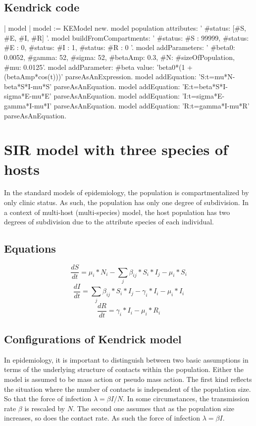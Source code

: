 \documentclass[a4paper,10pt,twoside]{book}
\begin{document}
\subsection{ Kendrick code}

\begin{code}{}
	| model |
	model := KEModel new.
	model population attributes: '{ #status: [#S, #E, #I, #R] }'.
	model
		buildFromCompartments:
			'{
		{ #status: #S }: 99999,
		{ #status: #E }: 0,
		{ #status: #I }: 1,
		{ #status: #R }: 0
	}'.
	model addParameters: '{
		#beta0: 0.0052,
		#gamma: 52,
		#sigma: 52,
		#betaAmp: 0.3,
		#N: #sizeOfPopulation,
		#mu: 0.0125}'.
	model
		addParameter: #beta
		value: 'beta0*(1 + (betaAmp*cos(t)))' parseAsAnExpression.
	model
		addEquation: 'S:t=mu*N-beta*S*I-mu*S' parseAsAnEquation.
	model
		addEquation: 'E:t=beta*S*I-sigma*E-mu*E' parseAsAnEquation.
	model
		addEquation: 'I:t=sigma*E-gamma*I-mu*I' parseAsAnEquation.
	model
		addEquation: 'R:t=gamma*I-mu*R' parseAsAnEquation.
\end{code}

\section{ SIR model with three species of hosts}
In the standard models of epidemiology, the population is compartmentalized by only clinic status.
As such, the population has only one degree of subdivision.
In a context of multi-host (multi-species) model, the host population has two degrees of subdivision due to the attribute species of each individual.
\subsection{ Equations}

  \begin{equation}
    \frac{dS}{dt} = \mu_i*N_i - \sum_j \beta_{ij}*S_i*I_j - \mu_i*S_i
  \end{equation}
  \begin{equation}
    \frac{dI}{dt} = \sum_j \beta_{ij}*S_i*I_j - \gamma_i*I_i - \mu_i*I_i
  \end{equation}
  \begin{equation}
    \frac{dR}{dt} = \gamma_i*I_i - \mu_i*R_i
  \end{equation}
  
\subsection{ Configurations of Kendrick model}
In epidemiology, it is important to distinguish between two basic assumptions in terms of the underlying structure of contacts within the population.
Either the model is assumed to be mass action or pseudo mass action.
The first kind reflects the situation where the number of contacts is independent of the population size.
So that the force of infection  $\lambda = \beta I / N$.
In some circumstances, the transmission rate  $\beta$ is rescaled by  $N$.
The second one assumes that as the population size increases, so does the contact rate.
As such the force of infection  $\lambda = \beta I$.
\end{document}
